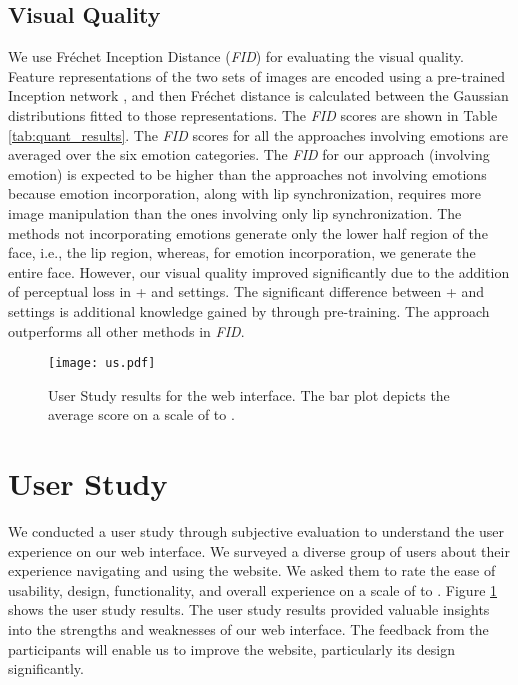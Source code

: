 \documentclass[accepted]{uai2023}
\begin{document}
\subsection{Visual Quality}
We use Fréchet Inception Distance (\emph{FID}) for evaluating the visual quality. Feature representations of the two sets of images are encoded using a pre-trained Inception network \citep{szegedy2015going}, and then Fréchet distance is calculated between the Gaussian distributions fitted to those representations. The \emph{FID} scores are shown in  Table \ref{tab:quant_results}. The \emph{FID} scores for all the approaches involving emotions are averaged over the six emotion categories. The \emph{FID} for our approach (involving emotion) is expected to be higher than the approaches not involving emotions \citep{prajwal2020lip, wang2021audio2head} because emotion incorporation, along with lip synchronization, requires more image manipulation than the ones involving only lip synchronization. The methods not incorporating emotions generate only the lower half region of the face, i.e., the lip region, whereas, for emotion incorporation, we generate the entire face. However, our visual quality improved significantly due to the addition of perceptual loss in + and  settings. The significant difference between + and  settings is additional knowledge gained by  through pre-training.
The  approach outperforms all other methods in \emph{FID}.

\begin{figure}[htp]
\texttt{[image: us.pdf]}
\caption{User Study results for the web interface. The bar
plot depicts the average score on a scale of  to .}
\label{fig:us_eval}
\end{figure}

\section{User Study}
We conducted a user study through subjective evaluation to understand the user experience on our web interface. We surveyed a diverse group of  users about their experience navigating and using the website. We asked them to rate the ease of usability, design, functionality, and overall experience on a scale of  to . 
Figure \ref{fig:us_eval} shows the user study results. The user study results provided valuable insights into the strengths and weaknesses of our web interface.
The feedback from the participants will enable us to improve the website, particularly its design significantly. 
\end{document}
